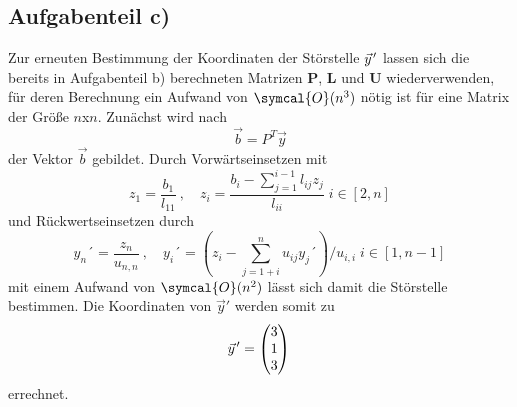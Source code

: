 \subsection*{Aufgabenteil c)}
Zur erneuten Bestimmung der Koordinaten der Störstelle $\pvec{y}'$ lassen sich die bereits
in Aufgabenteil b) berechneten Matrizen $\symbf{P}$, $\symbf{L}$ und $\symbf{U}$ wiederverwenden, für deren Berechnung ein Aufwand von $\symcal{O}(n^3)$ nötig ist für eine Matrix der Größe $n$x$n$. Zunächst wird nach 
\begin{equation}
  \vec{b} = P^{T} \vec{y}
\end{equation}
der Vektor $\vec{b}$ gebildet.
Durch Vorwärtseinsetzen mit
\begin{equation}
   z_1=\frac{b_1}{l_{11}} \: , \quad z_i=\frac{b_i-\sum_{j=1}^{i-1}l_{ij}z_j}{l_{ii}}\; i \in [2,n]
\end{equation}
und Rückwertseinsetzen durch
\begin{equation}
  y_n´=\frac{z_n}{u_{n,n}} \: , \quad y_i´=(z_i-\sum_{j=1+i}^{n}u_{ij}y_j´)/u_{i,i}\; i \in [1,n-1]
\end{equation}
mit einem Aufwand von $\symcal{O}(n^2)$ %
lässt sich damit die Störstelle bestimmen.
Die Koordinaten von $\vec{y}'$ werden somit zu
\begin{equation*}
  \pvec{y}'=
  \begin{pmatrix}
    3 \\
    1 \\
    3 \\
  \end{pmatrix} \\
\end{equation*}
errechnet.


